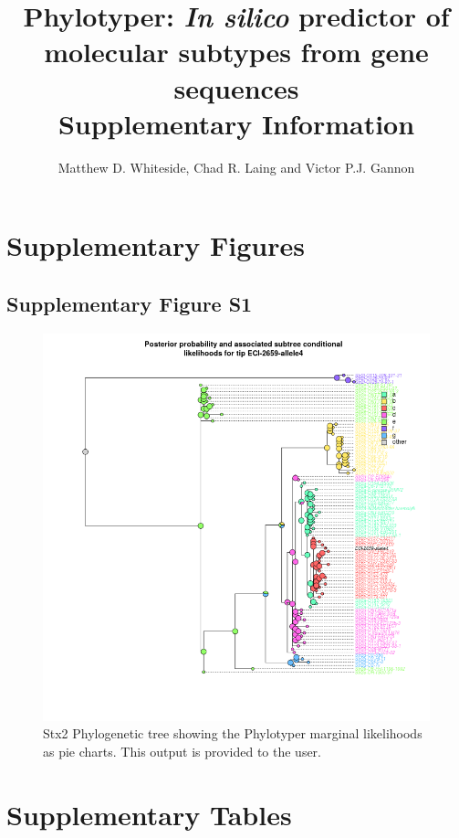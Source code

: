 \documentclass[11pt,letterpaper]{article}
\title{Phylotyper: {\it In silico} predictor of molecular subtypes from gene sequences \\ \large Supplementary Information}
\author{Matthew D. Whiteside, Chad R. Laing and Victor P.J. Gannon}
\date{ }
\begin{document}
 
 
\tableofcontents

\clearpage

\section{Supplementary Figures}

\subsection{Supplementary Figure S1}

\begin{figure}[h!]
\centering
\includegraphics[scale=0.5]{sfig01.png}
\caption{Stx2 Phylogenetic tree showing the Phylotyper marginal likelihoods as pie charts. This output is provided to the user.}
\end{figure}

\clearpage

\section{Supplementary Tables}
\end{document}
